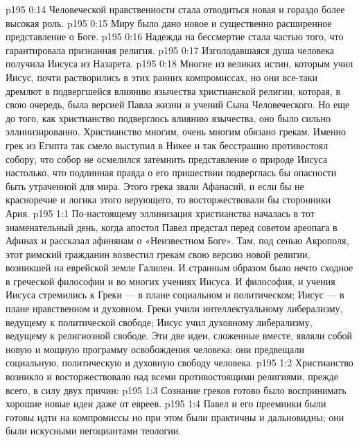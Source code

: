 \vs p195 0:14 \bibnobreakspace Человеческой нравственности стала отводиться новая и гораздо более высокая роль.
\vs p195 0:15 \bibnobreakspace Миру было дано новое и существенно расширенное представление о Боге.
\vs p195 0:16 \bibnobreakspace Надежда на бессмертие стала частью того, что гарантировала признанная религия.
\vs p195 0:17 \bibnobreakspace Изголодавшаяся душа человека получила Иисуса из Назарета.
\vs p195 0:18 \pc Многие из великих истин, которым учил Иисус, почти растворились в этих ранних компромиссах, но они все\hyp{}таки дремлют в подвергшейся влиянию язычества христианской религии, которая, в свою очередь, была версией Павла жизни и учений Сына Человеческого. Но еще до того, как христианство подверглось влиянию язычества, оно было сильно эллинизированно. Христианство многим, очень многим обязано грекам. Именно грек из Египта так смело выступил в Никее и так бесстрашно противостоял собору, что собор не осмелился затемнить представление о природе Иисуса настолько, что подлинная правда о его пришествии подверглась бы опасности быть утраченной для мира. Этого грека звали Афанасий, и если бы не красноречие и логика этого верующего, то восторжествовали бы сторонники Ария.
\vs p195 1:1 По\hyp{}настоящему эллинизация христианства началась в тот знаменательный день, когда апостол Павел предстал перед советом ареопага в Афинах и рассказал афинянам о «Неизвестном Боге». Там, под сенью Акрополя, этот римский гражданин возвестил грекам свою версию новой религии, возникшей на еврейской земле Галилеи. И странным образом было нечто сходное в греческой философии и во многих учениях Иисуса. И философия, и учения Иисуса стремились к  Греки --- в плане социальном и политическом; Иисус --- в плане нравственном и духовном. Греки учили интеллектуальному либерализму, ведущему к политической свободе; Иисус учил духовному либерализму, ведущему к религиозной свободе. Эти две идеи, сложенные вместе, являли собой новую и мощную программу освобождения человека; они предвещали социальную, политическую и духовную свободу человека.
\vs p195 1:2 Христианство возникло и восторжествовало над всеми противостоящими религиями, прежде всего, в силу двух причин:
\vs p195 1:3 \bibnobreakspace Сознание греков готово было воспринимать хорошие новые идеи даже от евреев.
\vs p195 1:4 \bibnobreakspace Павел и его преемники были готовы идти на компромиссы но при этом были практичны и дальновидны; они были искусными негоциантами теологии.
